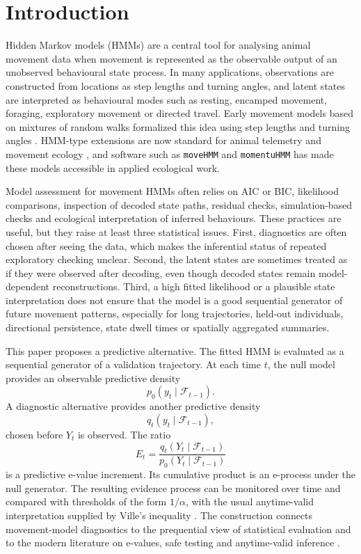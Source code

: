 \documentclass[pdflatex,sn-basic]{sn-jnl}
\theoremstyle{thmstyleone}
\theoremstyle{thmstyletwo}
\theoremstyle{thmstylethree}
\newcommand{\1}{\mathbf 1}
\newcommand{\calF}{\mathcal F}
\begin{document}
\section{Introduction}

Hidden Markov models (HMMs) are a central tool for analysing animal movement data when movement is represented as the observable output of an unobserved behavioural state process. In many applications, observations are constructed from locations as step lengths and turning angles, and latent states are interpreted as behavioural modes such as resting, encamped movement, foraging, exploratory movement or directed travel. Early movement models based on mixtures of random walks formalized this idea using step lengths and turning angles \citep{morales_2004_relocation}. HMM-type extensions are now standard for animal telemetry and movement ecology \citep{langrock_2012_telemetry,zucchini_2016_hmm}, and software such as \texttt{moveHMM} \citep{michelot_2016_movehmm} and \texttt{momentuHMM} \citep{mcclintock_2018_momentuhmm} has made these models accessible in applied ecological work.

Model assessment for movement HMMs often relies on AIC or BIC, likelihood comparisons, inspection of decoded state paths, residual checks, simulation-based checks and ecological interpretation of inferred behaviours. These practices are useful, but they raise at least three statistical issues. First, diagnostics are often chosen after seeing the data, which makes the inferential status of repeated exploratory checking unclear. Second, the latent states are sometimes treated as if they were observed after decoding, even though decoded states remain model-dependent reconstructions. Third, a high fitted likelihood or a plausible state interpretation does not ensure that the model is a good sequential generator of future movement patterns, especially for long trajectories, held-out individuals, directional persistence, state dwell times or spatially aggregated summaries.

This paper proposes a predictive alternative. The fitted HMM is evaluated as a sequential generator of a validation trajectory. At each time $t$, the null model provides an observable predictive density
\[
 p_0(y_t \mid \calF_{t-1}).
\]
A diagnostic alternative provides another predictive density
\[
 q_t(y_t \mid \calF_{t-1}),
\]
chosen before $Y_t$ is observed. The ratio
\[
 E_t=\frac{q_t(Y_t\mid \calF_{t-1})}{p_0(Y_t\mid \calF_{t-1})}
\]
is a predictive e-value increment. Its cumulative product is an e-process under the null generator. The resulting evidence process can be monitored over time and compared with thresholds of the form $1/\alpha$, with the usual anytime-valid interpretation supplied by Ville's inequality \citep{ville_1939_collectif,howard_2020_time_uniform}. The construction connects movement-model diagnostics to the prequential view of statistical evaluation \citep{dawid_1984_prequential} and to the modern literature on e-values, safe testing and anytime-valid inference \citep{vovk_wang_2021_evalues,grunwald_2024_safe_testing}.
\end{document}
